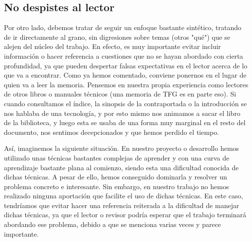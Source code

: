 \subsection{No despistes al lector}
Por otro lado, debemos tratar de seguir un enfoque bastante sintético, tratando de ir directamente al grano, sin digresiones sobre temas (otros "qué") que  se alejen del núcleo del trabajo. En efecto, es muy importante evitar incluir información o hacer referencia a cuestiones que no se hayan abordado con cierta profundidad, ya que pueden despertar falsas expectativas en el lector acerca de lo que va a encontrar. Como ya hemos comentado, conviene ponernos en el lugar de quien va a leer la memoria. Pensemos en nuestra propia experiencia como lectores de otros libros o manuales técnicos (una memoria de TFG es en parte eso). Si cuando consultamos el índice, la sinopsis de la contraportada o la introducción se nos hablaba de una tecnología, y por esto mismo nos animamos a sacar el libro de la biblioteca, y luego esta se usaba de una forma muy marginal en el resto del documento, nos sentimos decepcionados y que hemos perdido el tiempo.

Así, imaginemos la siguiente situación. En nuestro proyecto o desarrollo hemos utilizado unas técnicas bastantes complejas de aprender y con una curva de aprendizaje bastante plana al comienzo, siendo esta una dificultad conocida de dichas técnicas. A pesar de ello, hemos conseguido dominarla y resolver un problema concreto e interesante. Sin embargo, en nuestro trabajo no hemos realizado ninguna aportación que facilite el uso de dichas técnicas. En este caso, tendríamos que evitar hacer una referencia reiterada a la dificultad de manejar dichas técnicas, ya que el lector o revisor podría esperar que el trabajo terminará abordando ese problema, debido a que  se menciona varias veces y parece importante.


